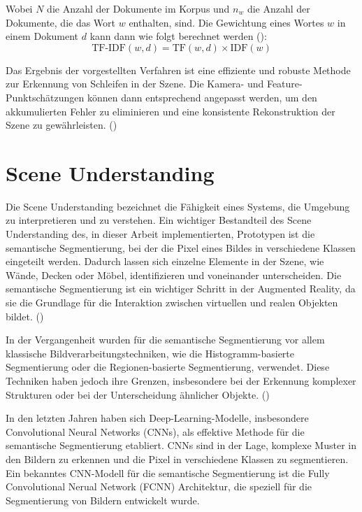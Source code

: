 Wobei \( N \) die Anzahl der Dokumente im Korpus und \( n_w \) die Anzahl der Dokumente, die das Wort \( w \) enthalten, sind. Die Gewichtung eines Wortes \( w \) in einem Dokument \( d \) kann dann wie folgt berechnet werden (\cite{gao2021vSLAM}):
\begin{equation}
    \text{TF-IDF}(w, d) = \text{TF}(w, d) \times \text{IDF}(w)
\end{equation}

Das Ergebnis der vorgestellten Verfahren ist eine effiziente und robuste Methode zur Erkennung von Schleifen in der Szene. Die Kamera- und Feature-Punktschätzungen können dann entsprechend angepasst werden, um den akkumulierten Fehler zu eliminieren und eine konsistente Rekonstruktion der Szene zu gewährleisten. (\cite{gao2021vSLAM})

\section{Scene Understanding}

Die Scene Understanding bezeichnet die Fähigkeit eines Systems, die Umgebung zu interpretieren und zu verstehen. Ein wichtiger Bestandteil des Scene Understanding des, in dieser Arbeit implementierten, Prototypen ist die semantische Segmentierung, bei der die Pixel eines Bildes in verschiedene Klassen eingeteilt werden. Dadurch lassen sich einzelne Elemente in der Szene, wie Wände, Decken oder Möbel, identifizieren und voneinander unterscheiden. Die semantische Segmentierung ist ein wichtiger Schritt in der Augmented Reality, da sie die Grundlage für die Interaktion zwischen virtuellen und realen Objekten bildet. (\cite{szeliski2022computerVision})

In der Vergangenheit wurden für die semantische Segmentierung vor allem klassische Bildverarbeitungstechniken, wie die Histogramm-basierte Segmentierung oder die Regionen-basierte Segmentierung, verwendet. Diese Techniken haben jedoch ihre Grenzen, insbesondere bei der Erkennung komplexer Strukturen oder bei der Unterscheidung ähnlicher Objekte. (\cite{szeliski2022computerVision})

In den letzten Jahren haben sich Deep-Learning-Modelle, insbesondere Convolutional Neural Networks (CNNs), als effektive Methode für die semantische Segmentierung etabliert. CNNs sind in der Lage, komplexe Muster in den Bildern zu erkennen und die Pixel in verschiedene Klassen zu segmentieren. Ein bekanntes CNN-Modell für die semantische Segmentierung ist die Fully Convolutional Nerual Network (FCNN) Architektur, die speziell für die Segmentierung von Bildern entwickelt wurde. \cite{long2014fcnn}

